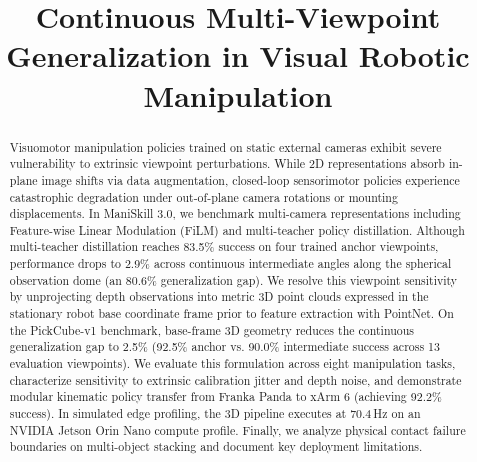 \documentclass[conference]{IEEEtran}
\begin{document}
\title{Continuous Multi-Viewpoint Generalization in Visual Robotic Manipulation}

\author{
\and
{}
}

\maketitle

\begin{abstract}
Visuomotor manipulation policies trained on static external cameras exhibit severe vulnerability to extrinsic viewpoint perturbations. While 2D representations absorb in-plane image shifts via data augmentation, closed-loop sensorimotor policies experience catastrophic degradation under out-of-plane camera rotations or mounting displacements. In ManiSkill 3.0, we benchmark multi-camera representations including Feature-wise Linear Modulation (FiLM) and multi-teacher policy distillation. Although multi-teacher distillation reaches 83.5\% success on four trained anchor viewpoints, performance drops to 2.9\% across continuous intermediate angles along the spherical observation dome (an 80.6\% generalization gap). We resolve this viewpoint sensitivity by unprojecting depth observations into metric 3D point clouds expressed in the stationary robot base coordinate frame prior to feature extraction with PointNet. On the PickCube-v1 benchmark, base-frame 3D geometry reduces the continuous generalization gap to 2.5\% (92.5\% anchor vs. 90.0\% intermediate success across 13 evaluation viewpoints). We evaluate this formulation across eight manipulation tasks, characterize sensitivity to extrinsic calibration jitter and depth noise, and demonstrate modular kinematic policy transfer from Franka Panda to xArm 6 (achieving 92.2\% success). In simulated edge profiling, the 3D pipeline executes at 70.4\,Hz on an NVIDIA Jetson Orin Nano compute profile. Finally, we analyze physical contact failure boundaries on multi-object stacking and document key deployment limitations.
\end{abstract}
\end{document}
